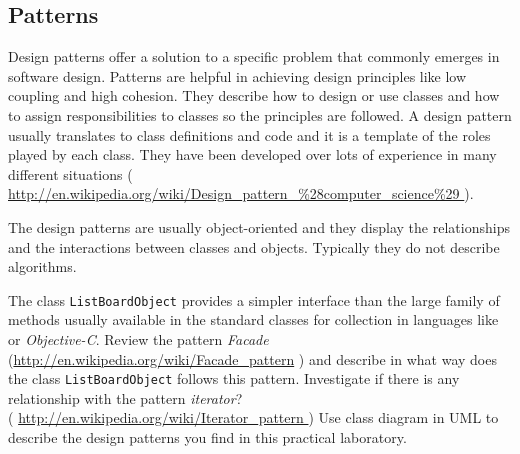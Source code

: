\documentclass[article,12pt]{article}
\begin{document}
\subsection*{Patterns}
Design patterns offer a solution to a specific problem that commonly
emerges in software design.
Patterns are helpful in achieving design principles
like low coupling and high cohesion. They describe how to design or use classes
and how to assign responsibilities to classes so the principles are
followed.
A design pattern usually translates to class definitions and code and it 
is a template of the roles played by each class.
They have been developed over lots of experience in many different
situations
({\small 
\url{http://en.wikipedia.org/wiki/Design_pattern_%
}}
).

The design patterns are usually object-oriented and they display the relationships
and the interactions between classes and objects.
Typically they do not describe algorithms.

The class
{\tt ListBoardObject} 
provides a simpler interface than the large family of methods
usually available in the standard classes for collection
in languages like
\Cpp\/ or {\em Objective-C}.
Review the pattern
  {\em Facade} 
({\small \url{http://en.wikipedia.org/wiki/Facade_pattern}}
) and describe in what way does the class
{\tt ListBoardObject} 
follows this pattern.
Investigate if there is any relationship with the pattern
 {\em iterator}?\\
({\small
\url{http://en.wikipedia.org/wiki/Iterator_pattern }})
Use class diagram in UML to describe the design patterns you
find in this practical laboratory.
\end{document}
